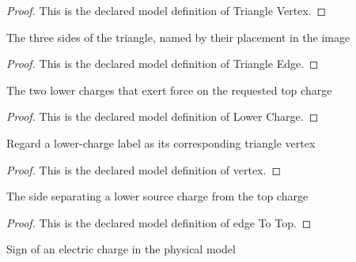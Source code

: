 \begin{proof}
  This is the declared model definition of Triangle Vertex.
\end{proof}
\begin{definition}
  \label{def:physics:phyx-mini-0893:phyxminiproblems-problemphyxmini0893-triangleedge}
  The three sides of the triangle, named by their placement in the image
\end{definition}
\begin{proof}
  This is the declared model definition of Triangle Edge.
\end{proof}
\begin{definition}
  \label{def:physics:phyx-mini-0893:phyxminiproblems-problemphyxmini0893-lowercharge}
  The two lower charges that exert force on the requested top charge
\end{definition}
\begin{proof}
  This is the declared model definition of Lower Charge.
\end{proof}
\begin{definition}[vertex]
  \label{def:physics:phyx-mini-0893:phyxminiproblems-problemphyxmini0893-lowercharge-vertex}
  Regard a lower-charge label as its corresponding triangle vertex
\end{definition}
\begin{proof}
  This is the declared model definition of vertex.
\end{proof}
\begin{definition}
  \label{def:physics:phyx-mini-0893:phyxminiproblems-problemphyxmini0893-lowercharge-edgetotop}
  The side separating a lower source charge from the top charge
\end{definition}
\begin{proof}
  This is the declared model definition of edge To Top.
\end{proof}
\begin{definition}
  \label{def:physics:phyx-mini-0893:phyxminiproblems-problemphyxmini0893-chargesign}
  Sign of an electric charge in the physical model
\end{definition}
